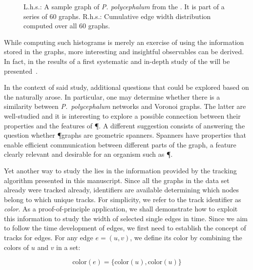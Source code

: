 	\begin{figure}[!htp]
		\centering
		\qquad
		\caption[Demo - Computing an observable across an entire series of graphs]{L.h.s.: A sample graph of \emph{P. polycephalum} from the \data. It is part of a series of $60$ graphs. R.h.s.: Cumulative edge width distribution computed over all $60$ graphs.}
    \end{figure}


	While computing such histograms is merely an exercise of using the information stored in the graphs, more interesting and insightful observables can be derived. In fact, in  the results of a first systematic and in-depth study of the \data will be presented~\cite{dirnberger2016}.

	In the context of said study, additional questions that could be explored based on the \data naturally arose. In particular, one may determine whether there is a similarity between \emph{P.~polycephalum} networks and Voronoi graphs. The latter are well-studied and it is interesting to explore a possible connection between their properties and the features of \P. A different suggestion consists of answering the question whether \P graphs are geometric spanners. Spanners have properties that enable efficient communication between different parts of the graph, a feature clearly relevant and desirable for an organism such as \P.

	Yet another way to study the \data lies in the information provided by the tracking algorithm presented in this manuscript.	Since all the graphs in the data set already were tracked already, identifiers are available determining which nodes belong to which unique tracks. For simplicity, we refer to the track identifier as \emph{color}. As a proof-of-principle application, we shall demonstrate how to exploit this information to study the width of selected single edges in time. Since we aim to follow the time development of edges, we first need to establish the concept of tracks for edges. For any edge $e = (u,v)$, we define its color by combining the colors of $u$ and $v$ in a set:

	\begin{equation}
		\text{color}(e) = \{\text{color}(u), \text{color}(u)\}
	\end{equation}

